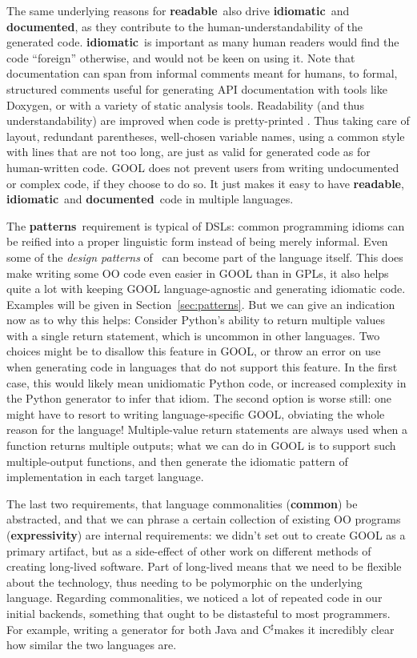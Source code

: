 \documentclass[sigplan,review,anonymous,prologue,dvipsnames]{acmart}
\newcommand{\Csharp}{C$^{\sharp}$}
\newcommand{\abbrev}[1]{\textbf{#1}}
\newcommand{\readable}{\abbrev{readable}}
\newcommand{\idiomatic}{\abbrev{idiomatic}}
\newcommand{\documented}{\abbrev{documented}}
\newcommand{\oopatterns}{\abbrev{patterns}}
\newcommand{\common}{\abbrev{common}}
\newcommand{\expressivity}{\abbrev{expressivity}}
\begin{document}
The same underlying reasons for \readable~also drive \idiomatic~and \documented,
as they contribute to the human-understandability of the generated code.
\idiomatic~is important as many human readers would find the code ``foreign''
otherwise, and would not be keen on using it.
Note that documentation can span from informal comments meant for humans, to
formal, structured comments useful for generating API documentation with tools
like Doxygen, or with a variety of static analysis tools.
Readability (and thus understandability) are improved when code is pretty-printed%
\cite{buse2009learning}. Thus taking care of layout, redundant parentheses,
well-chosen variable names, using a common style with lines that are not too
long, are just as valid for generated code as for human-written code.
GOOL does not prevent users from writing undocumented or complex code, if they
choose to do so. It just makes it easy to have \readable, \idiomatic~and
\documented~code in multiple languages.

The \oopatterns~requirement is typical of DSLs: common programming idioms
can be reified into a proper linguistic form instead of being merely
informal. Even some of the \emph{design patterns} of~\cite{gamma1995design}
can become part of the language itself. This does make writing some OO
code even easier in GOOL than in GPLs, it also helps quite a lot with
keeping GOOL language-agnostic and generating idiomatic code.
Examples will be given in Section~\ref{sec:patterns}.  But we can give an
indication now as to why this helps: Consider Python's
ability to return multiple values with a single return statement, which
is uncommon in other languages.  Two choices might be to disallow this
feature in GOOL, or throw an error on use when generating code in languages
that do not support this feature. In the first case, this would likely mean
unidiomatic Python code, or increased complexity in the Python generator to
infer that idiom. The second option is worse still: one might have to resort
to writing language-specific GOOL, obviating the whole reason for the language!
Multiple-value return statements are always used when a function returns multiple
outputs; what we can do in GOOL is to support such multiple-output functions,
and then generate the idiomatic pattern of implementation in each target
language.

The last two requirements, that language commonalities (\common) be abstracted,
and that we can phrase a certain collection of existing OO programs 
(\expressivity) are
internal requirements: we didn't set out to create GOOL as a primary artifact,
but as a side-effect of other work on different methods of creating long-lived
software.  Part of long-lived means that we need to be flexible about
the technology, thus needing to be polymorphic on the underlying language.
Regarding commonalities, we noticed a lot of repeated code in our initial
backends, something that ought to be distasteful to most programmers. For
example, writing a generator for both Java and \Csharp makes it incredibly
clear how similar the two languages are.
\end{document}
